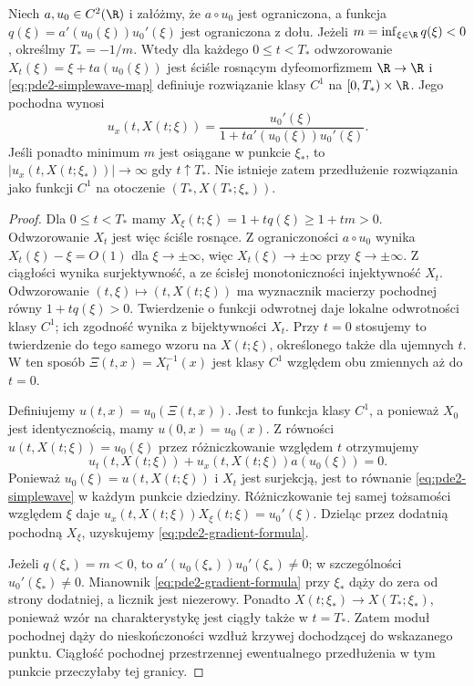 \begin{twierdzenie}
\label{thm:pde2-breaking}
Niech $a,u_0\in C^2(\R)$ i załóżmy, że
$a\circ u_0$ jest ograniczona, a funkcja
$q(\xi)=a'(u_0(\xi))u_0'(\xi)$ jest ograniczona z dołu.
Jeżeli $m=\inf_{\xi\in\R}q(\xi)<0$, określmy
$T_*=-1/m$. Wtedy dla każdego $0\leq t<T_*$
odwzorowanie $X_t(\xi)=\xi+t a(u_0(\xi))$
jest ściśle rosnącym dyfeomorfizmem $\R\to\R$ i
\eqref{eq:pde2-simplewave-map} definiuje rozwiązanie
klasy $C^1$ na $[0,T_*)\times\R$. Jego pochodna wynosi
\begin{equation}\label{eq:pde2-gradient-formula}
 u_x(t,X(t;\xi))=
 \frac{u_0'(\xi)}{1+t a'(u_0(\xi))u_0'(\xi)}.
\end{equation}
Jeśli ponadto minimum $m$ jest osiągane w punkcie
$\xi_*$, to $|u_x(t,X(t;\xi_*))|\to\infty$
gdy $t\uparrow T_*$. Nie istnieje zatem przedłużenie
rozwiązania jako funkcji $C^1$ na otoczenie
$(T_*,X(T_*;\xi_*))$.
\end{twierdzenie}
\begin{proof}
Dla $0\leq t<T_*$ mamy
$X_\xi(t;\xi)=1+tq(\xi)\geq1+tm>0$.
Odwzorowanie $X_t$ jest więc ściśle rosnące.
Z ograniczoności $a\circ u_0$ wynika
$X_t(\xi)-\xi=O(1)$ dla $\xi\to\pm\infty$,
więc $X_t(\xi)\to\pm\infty$ przy $\xi\to\pm\infty$.
Z ciągłości wynika surjektywność, a ze ścisłej
monotoniczności injektywność $X_t$.
Odwzorowanie $(t,\xi)\mapsto(t,X(t;\xi))$ ma wyznacznik
macierzy pochodnej równy $1+tq(\xi)>0$.
Twierdzenie o funkcji odwrotnej daje lokalne odwrotności
klasy $C^1$; ich zgodność wynika z bijektywności $X_t$.
Przy $t=0$ stosujemy to twierdzenie do tego samego wzoru
na $X(t;\xi)$, określonego także dla ujemnych $t$.
W ten sposób $\Xi(t,x)=X_t^{-1}(x)$ jest klasy $C^1$
względem obu zmiennych aż do $t=0$.

Definiujemy $u(t,x)=u_0(\Xi(t,x))$. Jest to funkcja klasy
$C^1$, a ponieważ $X_0$ jest identycznością, mamy
$u(0,x)=u_0(x)$. Z równości $u(t,X(t;\xi))=u_0(\xi)$
przez różniczkowanie względem $t$ otrzymujemy
\[
 u_t(t,X(t;\xi))+u_x(t,X(t;\xi))a(u_0(\xi))=0.
\]
Ponieważ $u_0(\xi)=u(t,X(t;\xi))$ i $X_t$ jest surjekcją,
jest to równanie \eqref{eq:pde2-simplewave} w każdym punkcie
dziedziny. Różniczkowanie tej samej tożsamości względem
$\xi$ daje $u_x(t,X(t;\xi))X_\xi(t;\xi)=u_0'(\xi)$.
Dzieląc przez dodatnią pochodną $X_\xi$, uzyskujemy
\eqref{eq:pde2-gradient-formula}.

Jeżeli $q(\xi_*)=m<0$, to
$a'(u_0(\xi_*))u_0'(\xi_*)\ne0$; w szczególności
$u_0'(\xi_*)\ne0$. Mianownik
\eqref{eq:pde2-gradient-formula} przy $\xi_*$
dąży do zera od strony dodatniej, a licznik jest niezerowy.
Ponadto $X(t;\xi_*)\to X(T_*;\xi_*)$, ponieważ wzór
na charakterystykę jest ciągły także w $t=T_*$.
Zatem moduł pochodnej dąży do nieskończoności wzdłuż
krzywej dochodzącej do wskazanego punktu. Ciągłość
pochodnej przestrzennej ewentualnego przedłużenia
w tym punkcie przeczyłaby tej granicy.
\end{proof}

